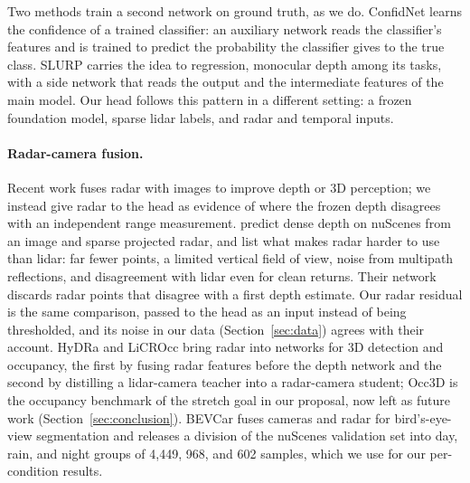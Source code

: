 Two methods train a second network on ground truth, as we do. ConfidNet \citep{corbiere2019confidnet} learns the confidence of a trained classifier: an auxiliary network reads the classifier's features and is trained to predict the probability the classifier gives to the true class. SLURP \citep{yu2021slurp} carries the idea to regression, monocular depth among its tasks, with a side network that reads the output and the intermediate features of the main model. Our head follows this pattern in a different setting: a frozen foundation model, sparse lidar labels, and radar and temporal inputs.

\paragraph{Radar-camera fusion.}
Recent work fuses radar with images to improve depth or 3D perception; we instead give radar to the head as evidence of where the frozen depth disagrees with an independent range measurement. \citet{lin2020radardepth} predict dense depth on nuScenes from an image and sparse projected radar, and list what makes radar harder to use than lidar: far fewer points, a limited vertical field of view, noise from multipath reflections, and disagreement with lidar even for clean returns. Their network discards radar points that disagree with a first depth estimate. Our radar residual is the same comparison, passed to the head as an input instead of being thresholded, and its noise in our data (Section~\ref{sec:data}) agrees with their account. HyDRa \citep{wolters2025hydra} and LiCROcc \citep{ma2024licrocc} bring radar into networks for 3D detection and occupancy, the first by fusing radar features before the depth network and the second by distilling a lidar-camera teacher into a radar-camera student; Occ3D \citep{tian2023occ3d} is the occupancy benchmark of the stretch goal in our proposal, now left as future work (Section~\ref{sec:conclusion}). BEVCar \citep{schramm2024bevcar} fuses cameras and radar for bird's-eye-view segmentation and releases a division of the nuScenes validation set into day, rain, and night groups of 4,449, 968, and 602 samples, which we use for our per-condition results.

